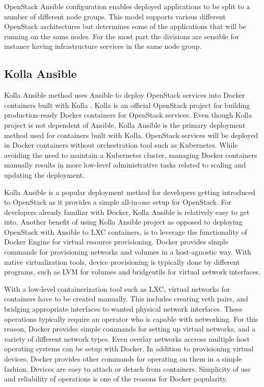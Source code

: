 OpenStack Ansible configuration enables deployed applications to be split to a
number of different node groups. This model supports various different
OpenStack architectures but determines some of the applications that will be
running on the same nodes. For the most part the divisions are sensible for
instance having infrastructure services in the same node group.

\subsection{Kolla Ansible}

Kolla Ansible \cite{kolla-ansible} method uses Ansible to deploy OpenStack
services into Docker containers built with Kolla \cite{kolla}. Kolla is an
official OpenStack project for building production-ready Docker containers for
OpenStack services. Even though Kolla project is not dependent of Ansible,
Kolla Ansible is the primary deployment method used for containers built with
Kolla. OpenStack services will be deployed in Docker containers without
orchestration tool such as Kubernetes. While avoiding the need to maintain a
Kubernetes cluster, managing Docker containers manually results in more
low-level administrative tasks related to scaling and updating the deployment.

Kolla Ansible is a popular deployment method for developers getting introduced
to OpenStack as it provides a simple all-in-one setup for OpenStack. For
developers already familiar with Docker, Kolla Ansible is relatively easy to
get into. Another benefit of using Kolla Ansible project as opposed to
deploying OpenStack with Ansible to LXC containers, is to leverage the
functionality of Docker Engine for virtual resource provisioning. Docker
provides simple commands for provisioning networks and volumes in a
host-agnostic way. With native virtualization tools, device provisioning is
typically done by different programs, such as LVM for volumes and bridgeutils
for virtual network interfaces.

With a low-level containerization tool such as LXC, virtual networks for
containers have to be created manually. This includes creating veth pairs, and
bridging appropriate interfaces to wanted physical network interfaces. These
operations typically require an operator who is capable with networking. For
this reason, Docker provides simple commands for setting up virtual networks,
and a variety of different network types. Even overlay networks accross
multiple host operating systems can be setup with Docker. In addition to
provisioning virtual devices, Docker provides other commands for operating on
them in a simple fashion. Devices are easy to attach or detach from containers.
Simplicity of use and reliability of operations is one of the reasons for
Docker popularity.

